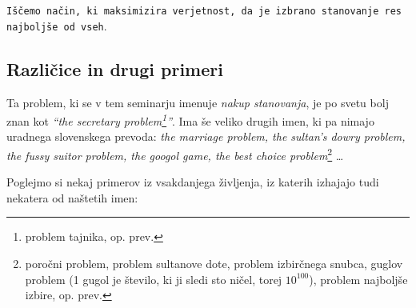 \documentclass[a4paper, 12pt, titlepage]{article}
\begin{document}
\begin{center}
\large
\texttt{Iščemo način, ki maksimizira verjetnost, da je izbrano stanovanje res najboljše od vseh}.
\end{center}

\subsection{Različice in drugi primeri}

Ta problem, ki se v tem seminarju imenuje \emph{nakup stanovanja}, je po svetu bolj znan kot \emph{``the secretary problem\footnote{problem tajnika, op. prev.}''}. Ima še veliko drugih imen, ki pa nimajo uradnega slovenskega prevoda: \emph{the marriage problem, the sultan's dowry problem, the fussy suitor problem, the googol game, the best choice problem}\footnote{poročni problem, problem sultanove dote, problem izbirčnega snubca, guglov problem (1 gugol je število, ki ji sledi sto ničel, torej $10^{100}$), problem najboljše izbire, op. prev.} \ldots

Poglejmo si nekaj primerov iz vsakdanjega življenja, iz katerih izhajajo tudi nekatera od naštetih imen:
\end{document}
